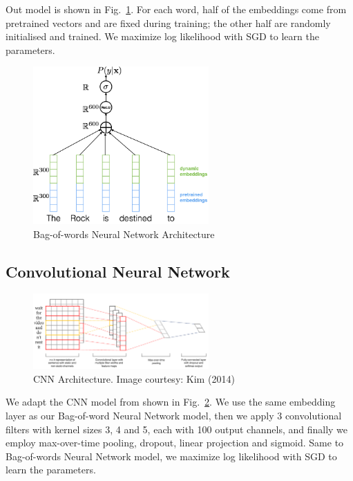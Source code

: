 \documentclass[11pt]{article}
\begin{document}
Out model is shown in Fig.~\ref{fig:network_cbow}.
For each word, half of the embeddings come from pretrained vectors and are fixed during training; the other half are randomly initialised and trained. 
We maximize log likelihood with SGD to learn the parameters.
\begin{figure}[H]
    \centering
    \includegraphics[width=0.6\textwidth]{HW1/writeup/images/network_cbow.png}
    \caption{Bag-of-words Neural Network Architecture}
    \label{fig:network_cbow}
\end{figure}


\subsection{Convolutional Neural Network}
\begin{figure}[H]
    \centering
    \includegraphics[width=0.6\textwidth]{HW1/writeup/images/network_cnn.png}
    \caption{CNN Architecture. Image courtesy: Kim (2014)}
    \label{fig:network_cnn}
\end{figure}
We adapt the CNN model from \cite{kim2014convolutional} shown in Fig.~\ref{fig:network_cnn}.
We use the same embedding layer as our Bag-of-word Neural Network model, then we apply 3 convolutional filters with kernel sizes 3, 4 and 5, each with 100 output channels, and finally we employ max-over-time pooling, dropout, linear projection and sigmoid.
Same to Bag-of-words Neural Network model, we maximize log likelihood with SGD to learn the parameters.
\end{document}
